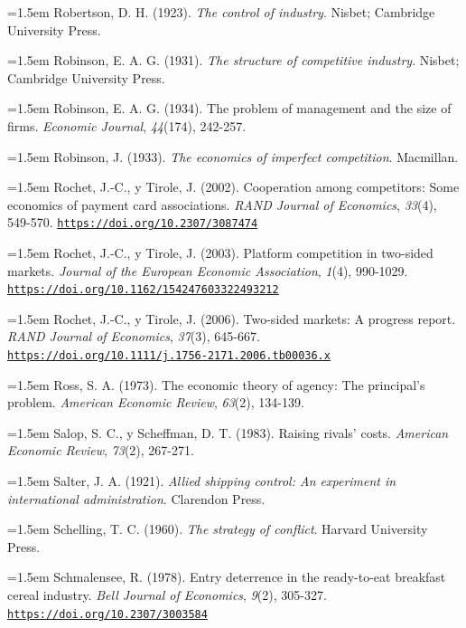 \documentclass[10pt,a4paper]{article}
\begin{document}
\noindent\hangindent=1.5em Robertson, D. H. (1923). \textit{The control of industry}. Nisbet; Cambridge University Press.

\noindent\hangindent=1.5em Robinson, E. A. G. (1931). \textit{The structure of competitive industry}. Nisbet; Cambridge University Press.

\noindent\hangindent=1.5em Robinson, E. A. G. (1934). The problem of management and the size of firms. \textit{Economic Journal}, \textit{44}(174), 242-257.

\noindent\hangindent=1.5em Robinson, J. (1933). \textit{The economics of imperfect competition}. Macmillan.

\noindent\hangindent=1.5em Rochet, J.-C., y Tirole, J. (2002). Cooperation among competitors: Some economics of payment card associations. \textit{RAND Journal of Economics}, \textit{33}(4), 549-570. \href{https://doi.org/10.2307/3087474}{\nolinkurl{https://doi.org/10.2307/3087474}}

\noindent\hangindent=1.5em Rochet, J.-C., y Tirole, J. (2003). Platform competition in two-sided markets. \textit{Journal of the European Economic Association}, \textit{1}(4), 990-1029. \href{https://doi.org/10.1162/154247603322493212}{\nolinkurl{https://doi.org/10.1162/154247603322493212}}

\noindent\hangindent=1.5em Rochet, J.-C., y Tirole, J. (2006). Two-sided markets: A progress report. \textit{RAND Journal of Economics}, \textit{37}(3), 645-667. \href{https://doi.org/10.1111/j.1756-2171.2006.tb00036.x}{\nolinkurl{https://doi.org/10.1111/j.1756-2171.2006.tb00036.x}}

\noindent\hangindent=1.5em Ross, S. A. (1973). The economic theory of agency: The principal's problem. \textit{American Economic Review}, \textit{63}(2), 134-139.

\noindent\hangindent=1.5em Salop, S. C., y Scheffman, D. T. (1983). Raising rivals' costs. \textit{American Economic Review}, \textit{73}(2), 267-271.

\noindent\hangindent=1.5em Salter, J. A. (1921). \textit{Allied shipping control: An experiment in international administration}. Clarendon Press.

\noindent\hangindent=1.5em Schelling, T. C. (1960). \textit{The strategy of conflict}. Harvard University Press.

\noindent\hangindent=1.5em Schmalensee, R. (1978). Entry deterrence in the ready-to-eat breakfast cereal industry. \textit{Bell Journal of Economics}, \textit{9}(2), 305-327. \href{https://doi.org/10.2307/3003584}{\nolinkurl{https://doi.org/10.2307/3003584}}
\end{document}
